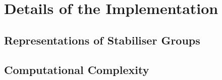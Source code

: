 \documentclass{standalone}
\begin{document}
\section{Details of the Implementation}
\subsection{Representations of Stabiliser Groups}
\subsection{Computational Complexity}
\ifstandalone

\fi
\end{document}
